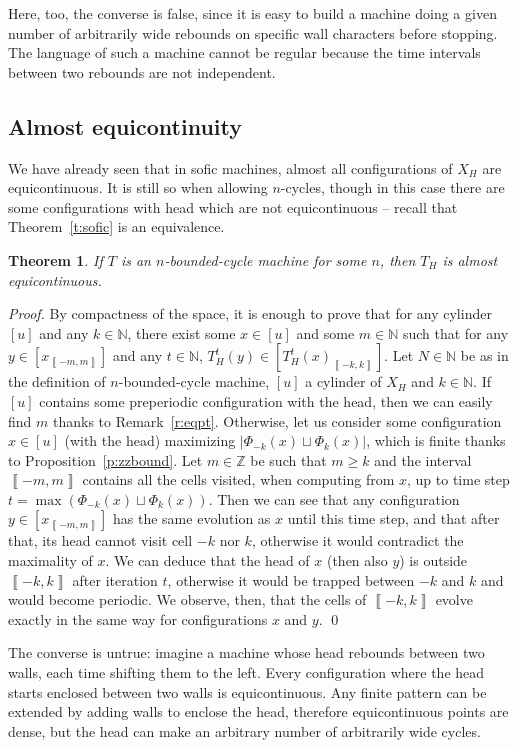 \documentclass{llncs}
\newtheorem{teo}{Theorem}
\newcommand{\Zset}{{\mathbb Z}}
\newcommand{\Nset}{{\mathbb N}}
\newcommand{\card}[1]{\left|#1\right|}
\newcommand{\co}[2]{\left\llbracket #1,#2\right\llbracket}\newcommand{\cc}[2]{\left\llbracket #1,#2\right\rrbracket}\newcommand{\oo}[2]{\left\rrbracket #1,#2\right\llbracket}\newcommand{\oc}[2]{\left\rrbracket #1,#2\right\rrbracket}\newcommand{\ci}[1]{\co{#1}\infty}\newcommand{\io}[1]{\oo{-\infty}{#1}}\newcommand{\oi}[1]{\oo{#1}\infty}\newcommand{\ic}[1]{\oc{-\infty}{#1}}
\newcommand{\scc}[2]{_{\cc{#1}{#2}}}\newcommand{\sco}[2]{_{\co{#1}{#2}}}\newcommand{\soo}[2]{_{\oo{#1}{#2}}}\newcommand{\soc}[2]{_{\oc{#1}{#2}}}\newcommand{\sci}[1]{_{\ci{#1}}}\newcommand{\sio}[1]{_{\io{#1}}}\newcommand{\soi}[1]{_{\oi{#1}}}\newcommand{\sic}[1]{_{\ic{#1}}}
\begin{document}
Here, too, the converse is false, since it is easy to build a machine doing a given number of arbitrarily wide rebounds on specific wall characters before stopping.
The language of such a machine cannot be regular because the time intervals between two rebounds are not independent.
\subsection{Almost equicontinuity}
We have already seen that in sofic machines, almost all configurations of $X_H$ are equicontinuous.
It is still so when allowing $n$-cycles, though in this case there are some configurations with head which are not equicontinuous -- recall that Theorem~\ref{t:sofic} is an equivalence.
\begin{teo}
 If $T$ is an $n$-bounded-cycle machine for some $n$, then $T_H$ is almost equicontinuous.
\end{teo}
\begin{proof}
 By compactness of the space, it is enough to prove that for any cylinder $[u]$ and any $k\in\Nset$, there exist some $x\in[u]$ and some $m\in\Nset$ such that for any $y\in[x\scc{-m}m]$ and any $t\in\Nset$, $T_H^t(y)\in[T_H^t(x)\scc{-k}k]$.
Let $N\in\Nset$ be as in the definition of $n$-bounded-cycle machine, $[u]$ a cylinder of $X_H$ and $k\in\Nset$.
If $[u]$ contains some preperiodic configuration with the head, then we can easily find $m$ thanks to Remark~\ref{r:eqpt}.
 Otherwise, let us consider some configuration $x\in[u]$ (with the head) maximizing $\card{\Phi_{-k}(x)\sqcup\Phi_k(x)}$, which is finite thanks to Proposition~\ref{p:zzbound}.
 Let $m\in\Zset$ be such that $m\ge k$ and the interval $\cc{-m}m$ contains all the cells visited, when computing from $x$, up to time step $t=\max(\Phi_{-k}(x)\sqcup\Phi_k(x))$.
 Then we can see that any configuration $y\in[x\scc{-m}m]$ has the same evolution as $x$ until this time step, and that after that, its head cannot visit cell $-k$ nor $k$, otherwise it would contradict the maximality of $x$.
 We can deduce that the head of $x$ (then also $y$) is outside $\cc{-k}k$ after iteration $t$, otherwise it would be trapped between $-k$ and $k$ and would become periodic.
 We observe, then, that the cells of $\cc{-k}k$ evolve exactly in the same way for configurations $x$ and $y$.
\qed\end{proof}
The converse is untrue: imagine a machine whose head rebounds between two walls, each time shifting them to the left.
Every configuration where the head starts enclosed between two walls is equicontinuous.
Any finite pattern can be extended by adding walls to enclose the head, therefore equicontinuous points are dense, but the head can make an arbitrary number of arbitrarily wide cycles.
\end{document}
